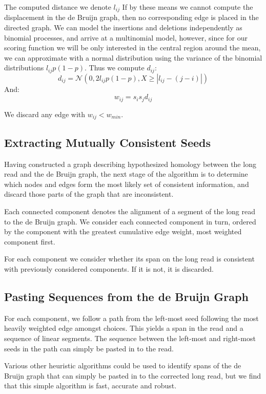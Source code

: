 \documentclass[twocolumn]{article}
\begin{document}
The computed distance we denote $l_{ij}$ If by these
means we cannot compute the displacement in the de Bruijn graph, then 
no corresponding edge is placed in the directed graph.
We can model the insertions and deletions independently
as binomial processes, and arrive at a multinomial model, however,
since for our scoring function we will be only interested in the central
region around the mean, we can approximate with a normal distribution
using the variance of the binomial distributions $l_{ij}p(1-p)$.
Thus we compute $d_{ij}$:
$$
    d_{ij} = \mathcal{N}\left(0, 2l_{ij}p\left(1 - p\right), X \ge \left|l_{ij} - \left(j - i\right)\right|\right)
$$
And:
$$
    w_{ij} = s_i s_j d_{ij}
$$

We discard any edge with $w_{ij} < w_{\textit{min}}$.

\subsection{Extracting Mutually Consistent Seeds}
\label{sec:comp}

Having constructed a graph describing hypothesized homology between
the long read and the de Bruijn graph, the next stage of the algorithm
is to determine which nodes and edges form the most likely set of consistent
information, and discard those parts of the graph that are inconsistent.

Each connected component denotes the alignment of a segment of the long read to
the de Bruijn graph. We consider each connected component in turn, ordered by the
component with the greatest cumulative edge weight, most weighted component first.

For each component we consider whether its span on the long read is consistent with
previously considered components. If it is not, it is discarded.

\subsection{Pasting Sequences from the de Bruijn Graph}
\label{sec:paste}

For each component, we follow a path from the left-most seed following
the most heavily weighted edge amongst choices. This yields a span
in the read and a sequence of linear segments. The sequence between
the left-most and right-most seeds in the path can simply be pasted
in to the read.

Various other heuristic algorithms could be used to identify spans of the
de Bruijn graph that can simply be pasted in to the corrected long read,
but we find that this simple algorithm is fast, accurate and robust.
\end{document}
